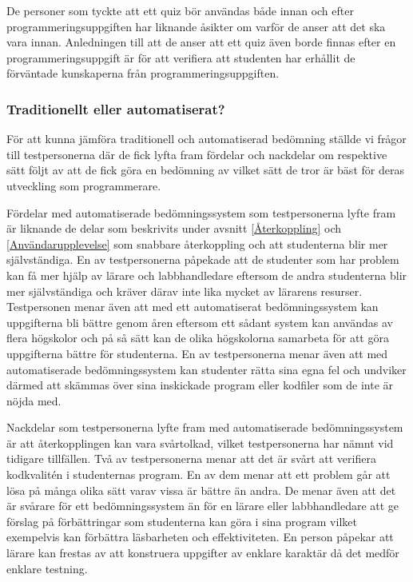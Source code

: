 \documentclass[a4paper,11pt]{article}
\begin{document}
{De personer som tyckte att ett quiz bör användas både innan och efter programmeringsuppgiften har liknande åsikter om varför de anser att det ska vara innan. Anledningen till att de anser att ett quiz även borde finnas efter en programmeringsuppgift är för att verifiera att studenten har erhållit de förväntade kunskaperna från programmeringsuppgiften. 

\subsubsection{Traditionellt eller automatiserat?}

För att kunna jämföra traditionell och automatiserad bedömning ställde vi frågor till testpersonerna där de fick lyfta fram fördelar och nackdelar om respektive sätt följt av att de fick göra en bedömning av vilket sätt de tror är bäst för deras utveckling som programmerare.

Fördelar med automatiserade bedömningssystem som testpersonerna lyfte fram är liknande de delar som beskrivits under avsnitt \ref{Återkoppling} och \ref{Användarupplevelse} som snabbare återkoppling och att studenterna blir mer självständiga. En av testpersonerna påpekade att de studenter som har problem kan få mer hjälp av lärare och labbhandledare eftersom de andra studenterna blir mer självständiga och kräver därav inte lika mycket av lärarens resurser. Testpersonen menar även att med ett automatiserat bedömningssystem kan uppgifterna bli bättre genom åren eftersom ett sådant system kan användas av flera högskolor och på så sätt kan de olika högskolorna samarbeta för att göra uppgifterna bättre för studenterna. En av testpersonerna menar även att med automatiserade bedömningssystem kan studenter rätta sina egna fel och undviker därmed att skämmas över sina inskickade program eller kodfiler som de inte är nöjda med.

Nackdelar som testpersonerna lyfte fram med automatiserade bedömningssystem är att återkopplingen kan vara svårtolkad, vilket testpersonerna har nämnt vid tidigare tillfällen. Två av testpersonerna menar att det är svårt att verifiera kodkvalitén i studenternas program. En av dem menar att ett problem går att lösa på många olika sätt varav vissa är bättre än andra. De menar även att det är svårare för ett bedömningssystem än för en lärare eller labbhandledare att ge förslag på förbättringar som studenterna kan göra i sina program vilket exempelvis kan förbättra läsbarheten och effektiviteten. En person påpekar att lärare kan frestas av att konstruera uppgifter av enklare karaktär då det medför enklare testning.

}
\end{document}
